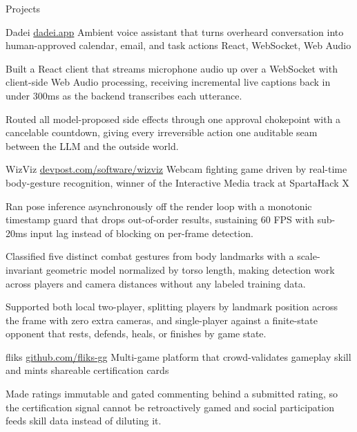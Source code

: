 \documentclass[
	11pt
]{../../../template}
\begin{document}
	\begin{rSection}{P}{rojects}
		\begin{rSectionEntry}
			{Dadei}
			{\href{https://dadei.app}{dadei.app}}
			{Ambient voice assistant that turns overheard conversation into human-approved calendar, email, and task actions}
			{React, WebSocket, Web Audio}
			{}

			\item Built a React client that streams microphone audio up over a WebSocket with client-side Web Audio processing, receiving incremental live captions back in under 300ms as the backend transcribes each utterance.
			\item Routed all model-proposed side effects through one approval chokepoint with a cancelable countdown, giving every irreversible action one auditable seam between the LLM and the outside world.
		\end{rSectionEntry}

		\begin{rSectionEntry}
			{WizViz}
			{\href{https://devpost.com/software/wizviz}{devpost.com/software/wizviz}}
			{Webcam fighting game driven by real-time body-gesture recognition, winner of the Interactive Media track at SpartaHack X}
			{}
			{}

			\item Ran pose inference asynchronously off the render loop with a monotonic timestamp guard that drops out-of-order results, sustaining 60 FPS with sub-20ms input lag instead of blocking on per-frame detection.
			\item Classified five distinct combat gestures from body landmarks with a scale-invariant geometric model normalized by torso length, making detection work across players and camera distances without any labeled training data.
			\item Supported both local two-player, splitting players by landmark position across the frame with zero extra cameras, and single-player against a finite-state opponent that rests, defends, heals, or finishes by game state.
		\end{rSectionEntry}

		\begin{rSectionEntry}
			{fliks}
			{\href{https://github.com/fliks-gg}{github.com/fliks-gg}}
			{Multi-game platform that crowd-validates gameplay skill and mints shareable certification cards}
			{}
			{}

			\item Made ratings immutable and gated commenting behind a submitted rating, so the certification signal cannot be retroactively gamed and social participation feeds skill data instead of diluting it.
		\end{rSectionEntry}
	\end{rSection}
\end{document}
